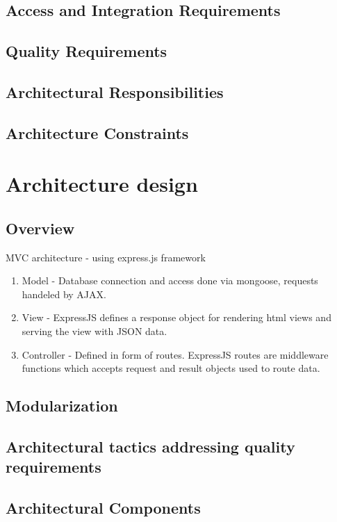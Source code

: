 \documentclass[hidelinks, 12pt, oneside]{article}
\begin{document}
\subsection{Access and Integration Requirements}

\subsection{Quality Requirements}

\subsection{Architectural Responsibilities}

\subsection{Architecture Constraints}

\section{Architecture design}
\subsection{Overview}
MVC architecture - using express.js framework
\begin {enumerate}
\item Model - Database connection and access done via mongoose, requests handeled by AJAX.
\item View - ExpressJS defines a response object for rendering html views and serving the view with JSON data.
\item Controller - Defined in form of routes. ExpressJS routes  are middleware functions which accepts request and result objects used to route data.
\end {enumerate}
\subsection{Modularization}

\subsection{Architectural tactics addressing quality requirements}

\subsection{Architectural Components}

\end{document}
